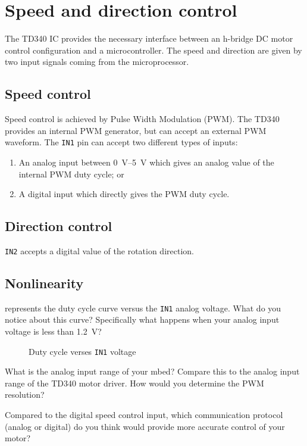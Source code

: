 \documentclass{exam}
\begin{document}
\section{Speed and direction control}
The TD340 IC provides the necessary interface between an h-bridge DC motor control configuration and a microcontroller. The speed and direction are given by two input signals coming from the microprocessor.

\subsection{Speed control}
Speed control is achieved by Pulse Width Modulation (PWM). The TD340 provides an internal PWM generator, but can accept an external PWM waveform.  The \lstinline{IN1} pin can accept two different types of inputs: 
\begin{enumerate}
\item An analog input between \SIrange{0}{5}{\volt} which gives an analog value of the internal PWM duty cycle; or
\item A digital input which directly gives the PWM duty cycle.  
\end{enumerate}
    
\subsection{Direction control}
\lstinline{IN2} accepts a digital value of the rotation direction. 

\subsection{Nonlinearity}
 represents the duty cycle curve versus the \lstinline{IN1} analog voltage.  What do you notice about this curve?  Specifically what happens when your analog input voltage is less than \SI{1.2}{\volt}?
\begin{figure}[h]
\caption{Duty cycle verses \lstinline{IN1} voltage}
\label{fig:2}
\end{figure}

What is the analog input range of your mbed?  Compare this to the analog input range of the TD340 motor driver.  How would you determine the PWM resolution?  

Compared to the digital speed control input, which communication protocol (analog or digital) do you think would provide more accurate control of your motor?
\end{document}

